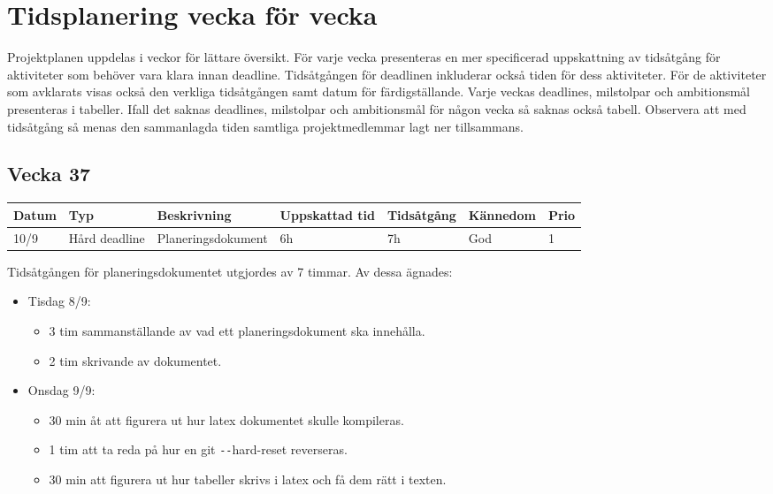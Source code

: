 \documentclass{TDP003mall}
\begin{document}
\section{Tidsplanering vecka för vecka}
Projektplanen uppdelas i veckor för lättare översikt. För varje vecka presenteras
 en mer specificerad uppskattning av tidsåtgång för aktiviteter som behöver vara
 klara innan deadline. Tidsåtgången för deadlinen inkluderar också tiden för dess
 aktiviteter. För de aktiviteter som avklarats visas också den verkliga tidsåtgången
 samt datum för färdigställande. Varje veckas deadlines, milstolpar och ambitionsmål presenteras
 i tabeller. Ifall det saknas deadlines, milstolpar och ambitionsmål för någon vecka så saknas också tabell. Observera att med tidsåtgång så menas den sammanlagda tiden samtliga projektmedlemmar lagt ner tillsammans.

\subsection{Vecka 37}
\begin{tabularx}{\linewidth}{|l|l|X|l|l|l|l|}
	\hline
	Datum & Typ           & Beskrivning        & Uppskattad tid & Tidsåtgång & Kännedom & Prio \\ [0.5ex]
	\hline                                             
	10/9  & Hård deadline & Planeringsdokument & 6h             & 7h         & God      & 1    \\
	\hline
\end{tabularx}

Tidsåtgången för planeringsdokumentet utgjordes av 7 timmar. Av dessa ägnades:
\begin{itemize}
	\item Tisdag 8/9:
	\begin{itemize}
		\item 3 tim sammanställande av vad ett planeringsdokument ska innehålla.
		\item 2 tim skrivande av dokumentet.
	\end{itemize}
	\item Onsdag 9/9:
	\begin{itemize}
		\item 30 min åt att figurera ut hur latex dokumentet skulle kompileras.
		\item 1 tim att ta reda på hur en git \texttt{-{}-}hard-reset reverseras.
		\item 30 min att figurera ut hur tabeller skrivs i latex och få dem rätt i texten.\\
	\end{itemize}
\end{itemize}
\end{document}
